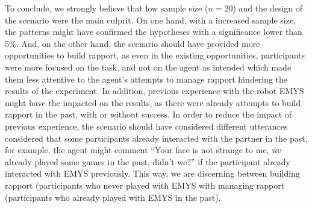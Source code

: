 To conclude, we strongly believe that low sample size ($n=20$) and the design of the scenario were the main culprit. On one hand, with a increased sample size, the patterns might have confirmed the hypotheses with a significance lower than 5\%. And, on the other hand, the scenario should have provided more opportunities to build rapport, as even in the existing opportunities, participants were more focused on the task, and not on the agent as intended which made them less attentive to the agent's attempts to manage rapport hindering the results of the experiment. In addition, previous experience with the robot \ac{EMYS} might have the impacted on the results, as there were already attempts to build rapport in the past, with or without success. In order to reduce the impact of previous experience, the scenario should have considered different utterances considered that some participants already interacted with the partner in the past, for example, the agent might comment ``Your face is not strange to me, we already played some games in the past, didn't we?'' if the participant already interacted with \ac{EMYS} previously. This way, we are discerning between building rapport (participants who never played with \ac{EMYS} with managing rapport (participants who already played with \ac{EMYS} in the past).